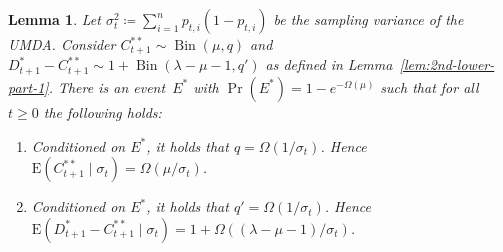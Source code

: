 \documentclass[11pt, a4paper]{article}
\newtheorem{lemma}{Lemma}
\newcommand{\umda}{UMDA\xspace}
\DeclareMathOperator{\Prob}{Pr}
\newcommand*{\E}{\mathrm{E}}
\DeclareMathOperator{\Bin}{Bin}
\begin{document}
\begin{lemma}
\label{lem:2nd-lower-part-1b}
Let $\sigma_t^2\coloneqq \sum_{i=1}^n p_{t,i}(1-p_{t,i})$ be the sampling variance of the \umda. 
Consider $C^{**}_{t+1}\sim \Bin(\mu,q)$  and $D^*_{t+1} - C^{**}_{t+1}\sim 1 + \Bin(\lambda-\mu-1,q')$ 
 as defined in Lemma~\ref{lem:2nd-lower-part-1}.  
There  is an event~$E^*$ with $\Prob(E^*)=1-e^{-\Omega(\mu)}$ 
such that for all $t\ge 0$ the following holds:
\begin{enumerate}
\item Conditioned on $E^*$, it holds that  $q=\Omega(1/\sigma_t)$. 
Hence $\E(C^{**}_{t+1}\mid \sigma_t)=\Omega(\mu/\sigma_t)$.
\item 
Conditioned on $E^*$, it holds that
  $q'=\Omega(1/\sigma_t)$. Hence $\E(D^*_{t+1}-C^{**}_{t+1}\mid \sigma_t) = 1+\Omega((\lambda-\mu-1)/\sigma_t)$.
\end{enumerate}
\end{lemma}
\end{document}
